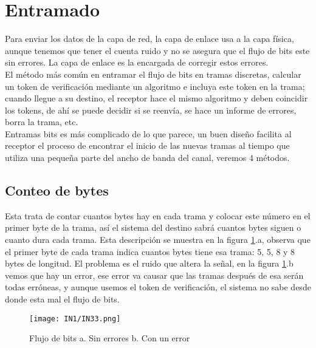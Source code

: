 \documentclass[
	12pt, %
	fleqn, %
	a4paper, %
	oneside, %
]{LegrandOrangeBook}
\begin{document}
\section{Entramado}
Para enviar los datos de la capa de red, la capa de enlace usa a la capa física, aunque tenemos que tener el cuenta ruido y no se asegura que el flujo de bits este sin errores. La capa de enlace es la encargada de corregir estos errores.\\
El método más común en entramar el flujo de bits en tramas discretas, calcular un token de verificación mediante un algoritmo e incluya este token en la trama; cuando llegue a su destino, el receptor hace el mismo algoritmo y deben coincidir los tokens, de ahí se puede decidir si se reenvía, se hace un informe de errores, borra la trama, etc.\\
Entramas bits es más complicado de lo que parece, un buen diseño facilita al receptor el proceso de encontrar el inicio de las nuevas tramas al tiempo que utiliza una pequeña parte del ancho de banda del canal, veremos 4 métodos. 
\subsection{Conteo de bytes}
Esta trata de contar cuantos bytes hay en cada trama y colocar este número en el primer byte de la trama, así el sistema del destino sabrá cuantos bytes siguen o cuanto dura cada trama. Esta descripción se muestra en la figura \ref{fig: conteo de bytes}.a, observa que el primer byte de cada trama indica cuantos bytes tiene esa trama: 5, 5, 8 y 8 bytes de longitud. El problema es el ruido que altera la señal, en la figura \ref{fig: conteo de bytes}.b vemos que hay un error, ese error va causar que las tramas después de esa serán todas erróneas, y aunque usemos el token de verificación, el sistema no sabe desde donde esta mal el flujo de bits.
\begin{figure}[H]
\centering
\texttt{[image: IN1/IN33.png]}
\caption{Flujo de bits a. Sin errores b. Con un error}
\label{fig: conteo de bytes}
\end{figure}
\end{document}
